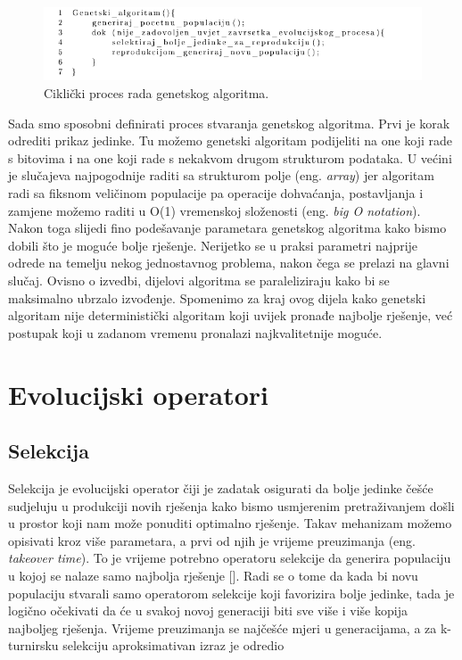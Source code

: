 \documentclass[times, utf8, zavrsni]{fer}
\begin{document}
	\begin{figure}[!htb]
		\centering
		\includegraphics[width=15cm]{slike/nenrGenAlg.png}
		\caption{Ciklički proces rada genetskog algoritma. }
		\label{fig:nenr-alg}
	\end{figure}
	
	
	Sada smo sposobni definirati proces stvaranja genetskog algoritma. Prvi je korak odrediti prikaz jedinke. Tu možemo genetski algoritam podijeliti na one koji rade s bitovima i na one koji rade s nekakvom drugom strukturom podataka. U većini je slučajeva najpogodnije raditi sa strukturom polje (eng. \emph{array}) jer algoritam radi sa fiksnom veličinom populacije pa operacije dohvaćanja, postavljanja i zamjene možemo raditi u O(1) vremenskoj složenosti (eng. \emph{big O notation}). Nakon toga slijedi fino podešavanje parametara genetskog algoritma kako bismo dobili što je moguće bolje rješenje. Nerijetko se u praksi parametri najprije odrede na temelju nekog jednostavnog problema, nakon čega se prelazi na glavni slučaj. Ovisno o izvedbi, dijelovi algoritma se paraleliziraju kako bi se maksimalno ubrzalo izvođenje. Spomenimo za kraj ovog dijela kako genetski algoritam nije deterministički algoritam koji uvijek pronađe najbolje rješenje, već postupak koji u zadanom vremenu pronalazi najkvalitetnije moguće. 
	
	\section{Evolucijski operatori}
	
	\subsection{Selekcija}
	\label{selekcija}
	
	Selekcija je evolucijski operator čiji je zadatak osigurati da bolje jedinke češće sudjeluju u produkciji novih rješenja kako bismo usmjerenim pretraživanjem došli u prostor koji nam može ponuditi optimalno rješenje. Takav mehanizam možemo opisivati kroz više parametara, a prvi od njih je vrijeme preuzimanja (eng. \emph{takeover time}). To je vrijeme potrebno operatoru selekcije da generira populaciju u kojoj se nalaze samo najbolja rješenje [\citet{GoldAndDeb}]. Radi se o tome da kada bi novu populaciju stvarali samo operatorom selekcije koji favorizira bolje jedinke, tada je logično očekivati da će u svakoj novoj generaciji biti sve više i više kopija najboljeg rješenja. Vrijeme preuzimanja se najčešće mjeri u generacijama, a za k-turnirsku selekciju aproksimativan izraz je odredio \citet{EvAlgsinTheoryAndPractise} 
	
\end{document}
